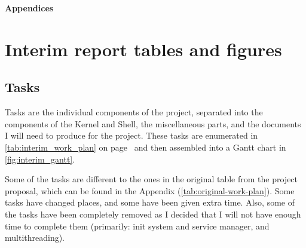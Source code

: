\documentclass{article}
\begin{document}
\nocite{osdev-wiki}
\nocite{unix-prog-env}
\printbibliography[heading=bibintoc]


































\clearpage
\appendix
{}
\newrefsection
{}
\renewcommand{\thesubsection}{\Alph{subsection}}
\renewcommand{\thesubsubsection}{\thesubsection.\alph{subsubsection}}

{\Large\bfseries Appendices\vspace{2ex}}

\section{Interim report tables and figures}

\subsection{Tasks}
Tasks are the individual components of the project, separated into the
components of the Kernel and Shell, the miscellaneous parts, and the documents
I will need to produce for the project. These tasks are enumerated in
\autoref{tab:interim_work_plan} on page~\pageref*{tab:work-plan} and then assembled into
a Gantt chart in \autoref{fig:interim_gantt}.

Some of the tasks are different to the ones in the original table from the
project proposal, which can be found in the Appendix
(\autoref{tab:original-work-plan}). Some tasks have changed places, and some
have been given extra time. Also, some of the tasks have been completely
removed as I decided that I will not have enough time to complete them
(primarily: init system and service manager, and multithreading).
\end{document}
